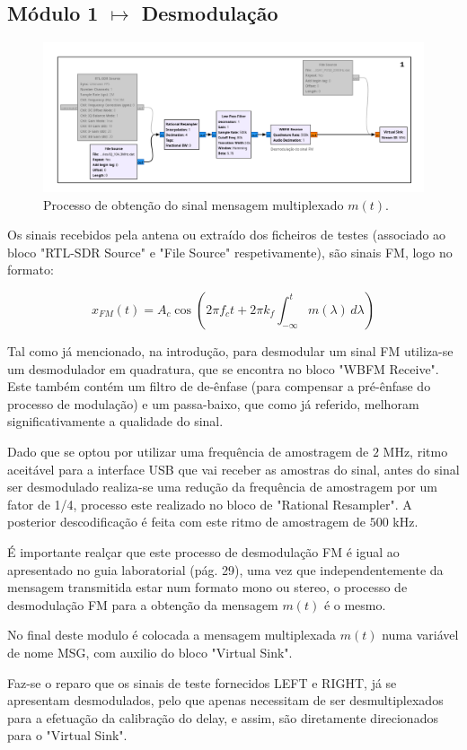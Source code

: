 \subsection{Módulo 1 $\pmb \mapsto$ Desmodulaç\~ao}
\label{subsec:mod1}

\begin{figure}[H]
    \centering
    \includegraphics[width = 1\linewidth]{img/mods/modulo1.png}
    \caption{Processo de obtenção do sinal mensagem multiplexado $m(t)$.}
    \label{fig:modulo1}
\end{figure}

Os sinais recebidos pela antena ou extraído dos ficheiros de testes (associado ao bloco "RTL-SDR Source" e "File Source" respetivamente), são sinais FM, logo no formato:

\begin{equation*}
    x_{FM}(t)=A_c \cos{(2\pi f_c t + 2 \pi k_f  \int_{-\infty}^{t} m(\lambda) \,d\lambda)}
\end{equation*}
 
Tal como já mencionado, na introdução, para desmodular um sinal FM utiliza-se um desmodulador em quadratura, que se encontra no bloco "WBFM Receive". Este também contém um filtro de de-ênfase (para compensar a pré-ênfase do processo de modulação) e um passa-baixo, que como já referido, melhoram significativamente a qualidade do sinal.

Dado que se optou por utilizar uma frequência de amostragem de $2$ MHz, ritmo aceitável para a interface USB que vai receber as amostras do sinal, antes do sinal ser desmodulado realiza-se uma redução da frequência de amostragem por um fator de 1/4, processo este realizado no bloco de "Rational Resampler". A posterior descodificação é feita com este ritmo de amostragem de $500$ kHz.

É importante realçar que este processo de desmodulação FM é igual ao apresentado no guia laboratorial (pág. 29), uma vez que independentemente da mensagem transmitida estar num formato mono ou stereo, o processo de desmodulação FM para a obtenção da mensagem $m(t)$ é o mesmo.

No final deste modulo é colocada a mensagem multiplexada $m(t)$ numa variável de nome MSG, com auxilio do bloco "Virtual Sink".

Faz-se o reparo que os sinais de teste fornecidos LEFT e RIGHT, já se apresentam desmodulados, pelo que apenas necessitam de ser desmultiplexados para a efetuação da calibração do delay, e assim, são diretamente direcionados para o "Virtual Sink".